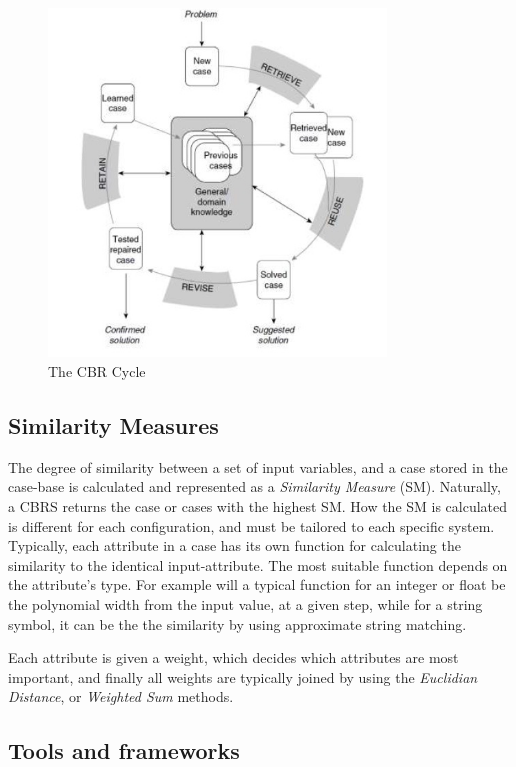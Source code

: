 \begin{figure}[H]
    \centering
    \includegraphics[width=0.8\textwidth]{fig/cbr_cycle.jpg}
    \caption{The CBR Cycle}
    \label{fig:cbr_cycle}
\end{figure}

\subsection{Similarity Measures}
The degree of similarity between a set of input variables, and a case stored in the case-base is calculated and represented as a \emph{Similarity Measure} (SM). Naturally, a CBRS returns the case or cases with the highest SM. How the SM is calculated is different for each configuration, and must be tailored to each specific system. Typically, each attribute in a case has its own function for calculating the similarity to the identical input-attribute. The most suitable function depends on the attribute's type. For example will a typical function for an integer or float be the polynomial width from the input value, at a given step, while for a string symbol, it can be the the similarity by using approximate string matching. 

Each attribute is given a weight, which decides which attributes are most important, and finally all weights are typically joined by using the \emph{Euclidian Distance}, or \emph{Weighted Sum} methods.

\subsection{Tools and frameworks}

